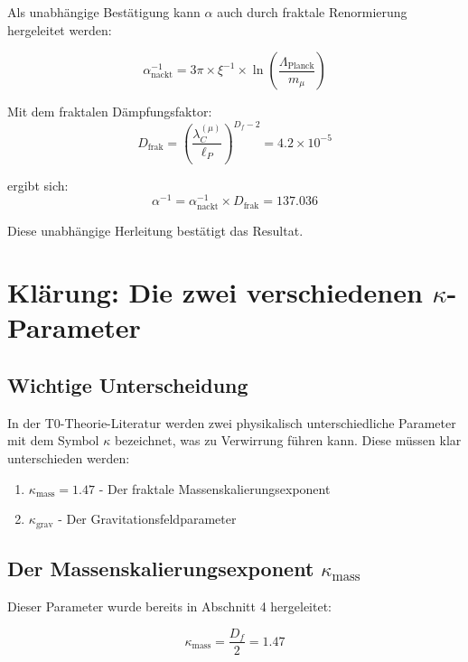 \documentclass[12pt,a4paper]{article}
\theoremstyle{definition}
\begin{document}
	Als unabh\"angige Best\"atigung kann $\alpha$ auch durch fraktale Renormierung hergeleitet werden:
	
	\begin{equation}
		\alpha_{\text{nackt}}^{-1} = 3\pi \times \xi^{-1} \times \ln\left(\frac{\Lambda_{\text{Planck}}}{m_\mu}\right)
	\end{equation}
	
	Mit dem fraktalen D\"ampfungsfaktor:
	\begin{equation}
		D_{\text{frak}} = \left(\frac{\lambda_C^{(\mu)}}{\ell_P}\right)^{D_f-2} = 4.2 \times 10^{-5}
	\end{equation}
	
	ergibt sich:
	\begin{equation}
		\alpha^{-1} = \alpha_{\text{nackt}}^{-1} \times D_{\text{frak}} = 137.036
	\end{equation}
	
	Diese unabh\"angige Herleitung best\"atigt das Resultat.
	
	\section{Kl\"arung: Die zwei verschiedenen $\kappa$-Parameter}
	
	\subsection{Wichtige Unterscheidung}
	
	In der T0-Theorie-Literatur werden zwei physikalisch unterschiedliche Parameter mit dem Symbol $\kappa$ bezeichnet, was zu Verwirrung f\"uhren kann. Diese m\"ussen klar unterschieden werden:
	
	\begin{enumerate}
		\item $\kappa_{\text{mass}} = 1.47$ - Der fraktale Massenskalierungsexponent
		\item $\kappa_{\text{grav}}$ - Der Gravitationsfeldparameter
	\end{enumerate}
	
	\subsection{Der Massenskalierungsexponent $\kappa_{\text{mass}}$}
	
	Dieser Parameter wurde bereits in Abschnitt 4 hergeleitet:
	
	\begin{equation}
		\kappa_{\text{mass}} = \frac{D_f}{2} = 1.47
	\end{equation}
	
\end{document}

